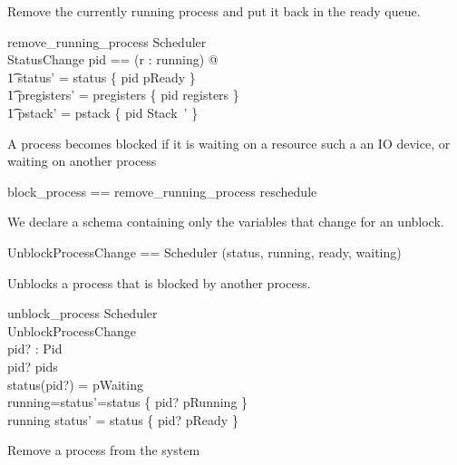 \documentclass{article}
\begin{document}
Remove the currently running process and put it back in the ready queue.

\begin{schema}{remove\_running\_process}
  \Delta Scheduler\\
  \Xi StatusChange
\where
  \exists pid == (\mu r : running) @\\
    \t1 status' = status \oplus \{ pid \mapsto pReady \} \land\\
    \t1 pregisters' = pregisters \oplus \{ pid \mapsto registers \} \land\\
    \t1 pstack' = pstack \oplus \{ pid \mapsto \theta Stack~' \}
\end{schema}

A process becomes blocked if it is waiting on a resource such a an IO
device, or waiting on another process

\begin{zed}
  block\_process == remove\_running\_process \semi reschedule
\end{zed}

We declare a schema containing only the variables that change for an
unblock.

\begin{zed}
  UnblockProcessChange == Scheduler \hide (status, running, ready, waiting)
\end{zed}

Unblocks a process that is blocked by another process.

\begin{schema}{unblock\_process}
  \Delta Scheduler\\
  \Xi UnblockProcessChange\\
  pid? : Pid\\
\where
  pid? \in pids\\
  status(pid?) = pWaiting\\
  running=\emptyset \iff status'=status \oplus \{ pid? \mapsto pRunning \}\\
  running \neq \emptyset \iff status' = status \oplus \{ pid? \mapsto pReady \}
\end{schema}

Remove a process from the system
\end{document}

